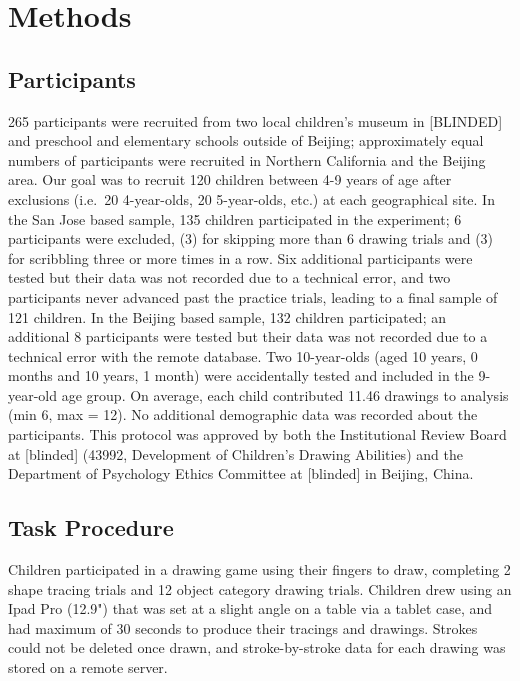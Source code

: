 \documentclass[
  english,
  man]{apa6}
\begin{document}
\hypertarget{methods}{%
\section{Methods}\label{methods}}

\hypertarget{participants}{%
\subsection{Participants}\label{participants}}

265 participants were recruited from two local children's museum in {[}BLINDED{]} and preschool and elementary schools outside of Beijing; approximately equal numbers of participants were recruited in Northern California and the Beijing area. Our goal was to recruit 120 children between 4-9 years of age after exclusions (i.e.~20 4-year-olds, 20 5-year-olds, etc.) at each geographical site. In the San Jose based sample, 135 children participated in the experiment; 6 participants were excluded, (3) for skipping more than 6 drawing trials and (3) for scribbling three or more times in a row. Six additional participants were tested but their data was not recorded due to a technical error, and two participants never advanced past the practice trials, leading to a final sample of 121 children. In the Beijing based sample, 132 children participated; an additional 8 participants were tested but their data was not recorded due to a technical error with the remote database. Two 10-year-olds (aged 10 years, 0 months and 10 years, 1 month) were accidentally tested and included in the 9-year-old age group. On average, each child contributed 11.46 drawings to analysis (min 6, max = 12). No additional demographic data was recorded about the participants. This protocol was approved by both the Institutional Review Board at {[}blinded{]} (43992, Development of Children's Drawing Abilities) and the Department of Psychology Ethics Committee at {[}blinded{]} in Beijing, China.

\hypertarget{task-procedure}{%
\subsection{Task Procedure}\label{task-procedure}}

Children participated in a drawing game using their fingers to draw, completing 2 shape tracing trials and 12 object category drawing trials. Children drew using an Ipad Pro (12.9") that was set at a slight angle on a table via a tablet case, and had maximum of 30 seconds to produce their tracings and drawings. Strokes could not be deleted once drawn, and stroke-by-stroke data for each drawing was stored on a remote server.
\end{document}
